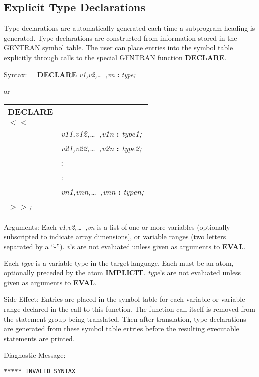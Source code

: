 \subsection{Explicit Type Declarations}
\label{explicit:type}
Type declarations are automatically generated each time a subprogram
heading is generated.  Type declarations are constructed
from information stored in the GENTRAN symbol table.  The user
can place entries into the symbol table explicitly through calls
to the special GENTRAN function {\bf DECLARE}. 
\begin{describe}{Syntax:}
{\bf \ \ DECLARE} {\it v1,v2,\dots\  ,vn} {\bf :} {\it type;}

    or

\begin{tabular}{ll}
{\bf DECLARE}\\
{\bf $<$$<$}\\
&{\it v11,v12,\dots\  ,v1n} {\bf :} {\it type1;}\\
&{\it v21,v22,\dots\  ,v2n} {\bf :} {\it type2;}\\
& :\\
& :\\
&{\it vn1,vnn,\dots\  ,vnn} {\bf :} {\it typen;}\\
{\bf $>$$>$}{\it ;}
\end{tabular}
\end{describe}
\begin{describe}{Arguments:}
Each {\it v1,v2,\dots\  ,vn} is a list of one or more variables
(optionally subscripted to indicate array dimensions), or
variable ranges (two letters separated by a ``-'').  {\it v}'s are
not evaluated unless given as arguments to {\bf EVAL}.

Each {\it type} is a variable type in the target language.  Each
must be an atom, optionally preceded by the atom {\bf IMPLICIT}.
{\it type}'s are not evaluated unless given as arguments to {\bf EVAL}.
\end{describe}
\begin{describe}{Side Effect:}
Entries are placed in the symbol table for each variable or
variable range declared in the call to this function.  The function
call itself is removed from the statement group being
translated.  Then after translation, type declarations are
generated from these symbol table entries before the resulting
executable statements are printed.
\end{describe}
\begin{describe}{Diagnostic Message:}
\begin{verbatim}
***** INVALID SYNTAX
\end{verbatim}
\end{describe}
